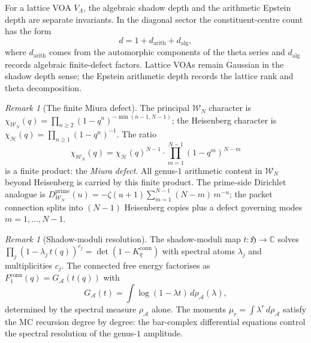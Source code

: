 \documentclass[11pt,reqno]{amsart}
\theoremstyle{definition}
\theoremstyle{remark}
\newtheorem{remark}[theorem]{Remark}
\providecommand{\cA}{\mathcal{A}}
\providecommand{\cH}{\mathcal{H}}
\providecommand{\cW}{\mathcal{W}}
\providecommand{\bC}{\mathbb{C}}
\providecommand{\conn}{\mathrm{conn}}
\numberwithin{equation}{section}
\begin{document}
For a lattice VOA $V_\Lambda$, the algebraic shadow depth and the
arithmetic Epstein depth are separate invariants. In the diagonal
sector the constituent-centre count has the form
\[
d=1+d_{\mathrm{arith}}+d_{\mathrm{alg}},
\]
where $d_{\mathrm{arith}}$ comes from the automorphic components of
the theta series and $d_{\mathrm{alg}}$ records algebraic
finite-defect factors. Lattice VOAs remain Gaussian in the shadow
depth sense; the Epstein arithmetic depth records the lattice rank
and theta decomposition.

\begin{remark}[The finite Miura defect]\label{rem:miura-defect}
  The principal $\cW_N$ character is
  $\chi_{\cW_N}(q)
  = \prod_{n \ge 2}(1 - q^n)^{-\min(n-1, N-1)}$;
  the Heisenberg character is
  $\chi_\cH(q) = \prod_{n \ge 1}(1 - q^n)^{-1}$. The ratio
  \[
    \chi_{\cW_N}(q)
    = \chi_\cH(q)^{N-1}
    \cdot \prod_{m=1}^{N-1}(1 - q^m)^{N-m}
  \]
  is a finite product: the \emph{Miura defect}. All genus-$1$
  arithmetic content in $\cW_N$ beyond Heisenberg is carried by
  this finite product. The prime-side Dirichlet analogue is
  $D_{\cW_N}^{\mathrm{prime}}(u)
  = -\zeta(u+1)\sum_{m=1}^{N-1}(N-m)\,m^{-u}$;
  the packet connection splits into $(N-1)$ Heisenberg copies plus
  a defect governing modes $m = 1, \ldots, N-1$.
\end{remark}

\begin{remark}[Shadow-moduli resolution]\label{rem:shadow-moduli}
  The shadow-moduli map $t\colon \mathfrak{H} \to \bC$ solves
  $\prod_j(1 - \lambda_j\,t(q))^{c_j}
  = \det(1 - K_q^{\conn})$
  with spectral atoms $\lambda_j$ and multiplicities $c_j$.
  The connected free energy factorises as
  $F_1^{\conn}(q) = G_\cA(t(q))$ with
  \[
    G_\cA(t)
    = \int \log(1 - \lambda t)\, d\rho_\cA(\lambda),
  \]
  determined by the spectral measure $\rho_\cA$ alone.
  The moments $\mu_r = \int \lambda^r\, d\rho_\cA$ satisfy the
  MC recursion degree by degree: the bar-complex differential
  equations control the spectral resolution of the genus-$1$
  amplitude.
\end{remark}

\end{document}
